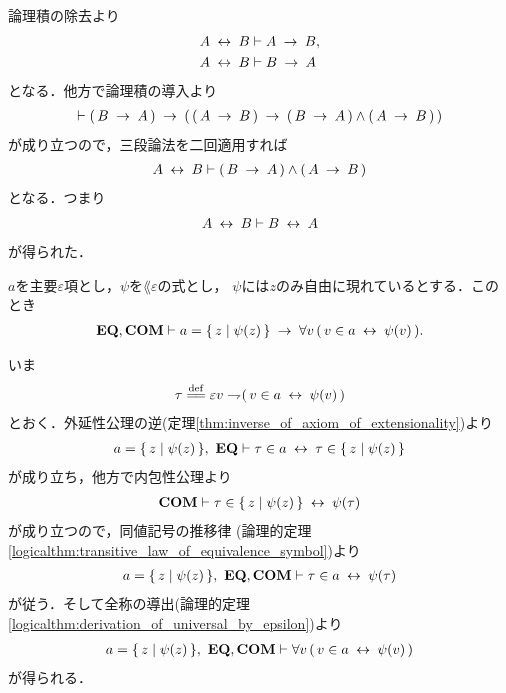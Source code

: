 	\begin{prf}
		論理積の除去より
		\begin{align}
			A \lrarrow B &\vdash A \rarrow B, \\
			A \lrarrow B &\vdash B \rarrow A
		\end{align}
		となる．他方で論理積の導入より
		\begin{align}
			\vdash (\, B \rarrow A\, ) \rarrow (\, (\, A \rarrow B\, ) \rarrow 
			(\, B \rarrow A\, ) \wedge (\, A \rarrow B\, )\, )
		\end{align}
		が成り立つので，三段論法を二回適用すれば
		\begin{align}
			A \lrarrow B \vdash (\, B \rarrow A\, ) \wedge (\, A \rarrow B\, )
		\end{align}
		となる．つまり
		\begin{align}
			A \lrarrow B \vdash B \lrarrow A
		\end{align}
		が得られた．
		\QED
	\end{prf}
	
	\begin{screen}
		\begin{thm}
		\label{thm:equivalent_formula_rewriting_1}
			$a$を主要$\varepsilon$項とし，$\psi$を$\lang{\varepsilon}$の式とし，
			$\psi$には$z$のみ自由に現れているとする．このとき
			\begin{align}
				\EQAX,\COMAX \vdash a = \Set{z}{\psi(z)} 
				\rarrow \forall v\, (\, v \in a \lrarrow \psi(v)\, ).
			\end{align}
		\end{thm}
	\end{screen}
	
	\begin{sketch}
		いま
		\begin{align}
			\tau \defeq \varepsilon v \negation (\, v \in a \lrarrow \psi(v)\, )
		\end{align}
		とおく．外延性公理の逆(定理\ref{thm:inverse_of_axiom_of_extensionality})より
		\begin{align}
			a = \Set{z}{\psi(z)},\ \EQAX \vdash 
			\tau \in a \lrarrow \tau \in \Set{z}{\psi(z)}
		\end{align}
		が成り立ち，他方で内包性公理より
		\begin{align}
			\COMAX \vdash \tau \in \Set{z}{\psi(z)} \lrarrow \psi(\tau)
		\end{align}
		が成り立つので，同値記号の推移律
		(論理的定理\ref{logicalthm:transitive_law_of_equivalence_symbol})より
		\begin{align}
			a = \Set{z}{\psi(z)},\ \EQAX,\COMAX \vdash \tau \in a \lrarrow \psi(\tau)
		\end{align}
		が従う．そして全称の導出(論理的定理\ref{logicalthm:derivation_of_universal_by_epsilon})より
		\begin{align}
			a = \Set{z}{\psi(z)},\ \EQAX,\COMAX \vdash 
			\forall v\, (\, v \in a \lrarrow \psi(v)\, )
		\end{align}
		が得られる．
		\QED
	\end{sketch}
	
